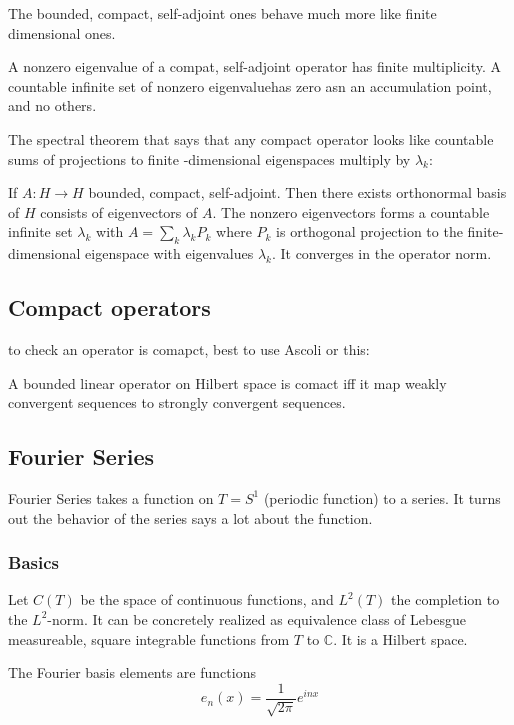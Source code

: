 \documentclass[main.tex]{subfiles}
\begin{document}
The bounded, compact, self-adjoint ones behave much more like finite dimensional ones. 

A nonzero eigenvalue of a compat, self-adjoint operator has finite multiplicity. A countable infinite set of nonzero eigenvaluehas zero asn an accumulation point, and no others.

The spectral theorem that says that any compact operator looks like countable sums of projections to finite -dimensional eigenspaces multiply by $\lambda_k$:

\begin{theorem}
If $A : H \rightarrow H$ bounded, compact, self-adjoint. Then there exists orthonormal basis of $H$ consists of eigenvectors of $A$. The nonzero eigenvectors forms a countable infinite set $\lambda_k$ with $A = \sum_k \lambda_k P_k$ where $P_k$ is orthogonal projection to the finite-dimensional eigenspace with eigenvalues $\lambda_k$. It converges in the operator norm.
\end{theorem}

\subsection{Compact operators}
to check an operator is comapct, best to use Ascoli or this:

\begin{theroem}
A bounded linear operator on Hilbert space is comact iff it map weakly convergent sequences to strongly convergent sequences.
\end{theroem}

\subsection{Fourier Series}
Fourier Series takes a function on $T = S^1$ (periodic function) to a series. It turns out the behavior of the series says a lot about the function.

\subsubsection{Basics}
Let $C(T)$ be the space of continuous functions, and $L^2(T)$ the completion to the $L^2$-norm.
It can be concretely realized as equivalence class of Lebesgue measureable, square integrable functions from $T$ to $\mathbb{C}$. It is a Hilbert space. 

The Fourier basis elements are functions
$$
e_n(x) = \frac{1}{\sqrt{2 \pi}} e^{inx}
$$
\end{document}
